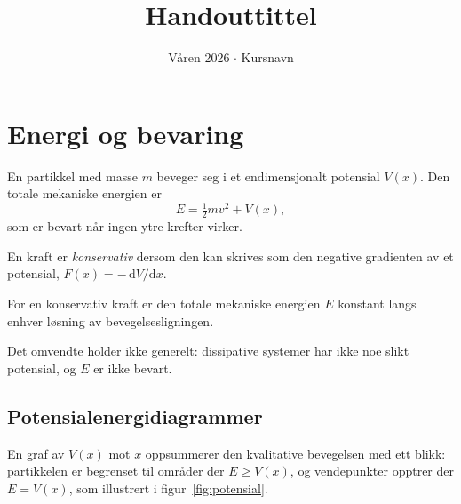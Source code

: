\documentclass[11pt]{article}
\title{Handouttittel}
\date{Våren 2026 $\cdot$ Kursnavn}
\begin{document}
\maketitle


\section{Energi og bevaring}

En partikkel med masse $m$ beveger seg i et endimensjonalt potensial $V(x)$. Den totale mekaniske energien er
\begin{equation}
  E = \tfrac{1}{2} m v^2 + V(x),
\end{equation}
som er bevart når ingen ytre krefter virker.

\begin{viktig}
\begin{definisjon}
En kraft er \emph{konservativ} dersom den kan skrives som den negative gradienten av et potensial, $F(x) = -\,\mathrm{d}V/\mathrm{d}x$.
\end{definisjon}
\end{viktig}

\begin{hovedresultat}[Energibevaring]
\begin{teorem}
For en konservativ kraft er den totale mekaniske energien $E$ konstant langs enhver løsning av bevegelsesligningen.
\end{teorem}
\end{hovedresultat}

\begin{merknad}
Det omvendte holder ikke generelt: dissipative systemer har ikke noe slikt potensial, og $E$ er ikke bevart.
\end{merknad}

\subsection{Potensialenergidiagrammer}

En graf av $V(x)$ mot $x$ oppsummerer den kvalitative bevegelsen med ett blikk: partikkelen er begrenset til områder der $E \ge V(x)$, og vendepunkter opptrer der $E = V(x)$, som illustrert i figur~\ref{fig:potensial}.
\end{document}

